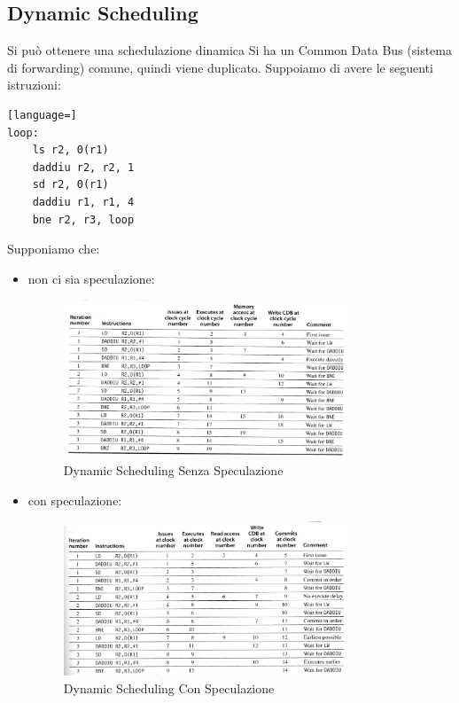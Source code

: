 \documentclass[12pt]{article}
\begin{document}
\subsection{Dynamic Scheduling}
Si pu\`o ottenere una schedulazione dinamica
Si ha un Common Data Bus (sistema di forwarding) comune, quindi viene duplicato. Suppoiamo di avere le seguenti istruzioni:
\begin{lstlisting}[language=]
loop:
    ls r2, 0(r1)
    daddiu r2, r2, 1
    sd r2, 0(r1)
    daddiu r1, r1, 4
    bne r2, r3, loop
\end{lstlisting}
Supponiamo che:
\begin{itemize}
    \item non ci sia speculazione:
    \begin{figure}[H]
        \centering
        \includegraphics[width=0.8\textwidth]{dynamic-scheduling-senza-speculazione.png}
        \caption{Dynamic Scheduling Senza Speculazione}
        \label{fig:dynamic-scheduling-senza-speculazione}
    \end{figure}
    \item con speculazione:
        \begin{figure}[H]
            \centering
            \includegraphics[width=0.8\textwidth]{dynamic-scheduling-con-speculazione.png}
            \caption{Dynamic Scheduling Con Speculazione}
            \label{fig:dynamic-scheduling-con-speculazione}
        \end{figure}
\end{itemize}
\end{document}
